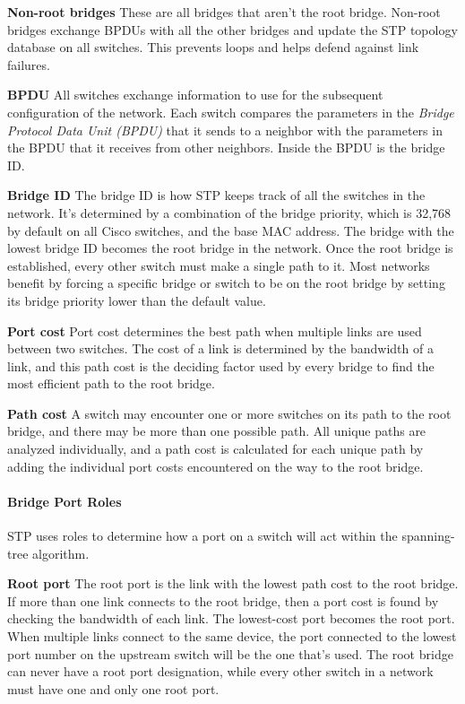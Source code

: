 \textbf{Non-root bridges} These are all bridges that aren't the root
bridge. Non-root bridges exchange BPDUs with all the other bridges and
update the STP topology database on all switches. This prevents loops
and helps defend against link failures.

\textbf{BPDU} All switches exchange information to use for the
subsequent configuration of the network. Each switch compares the
parameters in the \emph{Bridge Protocol Data Unit (BPDU)} that it sends
to a neighbor with the parameters in the BPDU that it receives from
other neighbors. Inside the BPDU is the bridge ID.

\textbf{Bridge ID} The bridge ID is how STP keeps track of all the
switches in the network. It's determined by a combination of the bridge
priority, which is 32,768 by default on all Cisco switches, and the base
MAC address. The bridge with the lowest bridge ID becomes the root
bridge in the network. Once the root bridge is established, every other
switch must make a single path to it. Most networks benefit by forcing a
specific bridge or switch to be on the root bridge by setting its bridge
priority lower than the default value.

\textbf{Port cost} Port cost determines the best path when multiple
links are used between two switches. The cost of a link is determined by
the bandwidth of a link, and this path cost is the deciding factor used
by every bridge to find the most efficient path to the root bridge.

\textbf{Path cost} A switch may encounter one or more switches on its
path to the root bridge, and there may be more than one possible path.
All unique paths are analyzed individually, and a path cost is
calculated for each unique path by adding the individual port costs
encountered on the way to the root bridge.

\paragraph{Bridge Port Roles}

STP uses roles to determine how a port on a switch will act within the
spanning-tree algorithm.

\textbf{Root port} The root port is the link with the lowest path cost
to the root bridge. If more than one link connects to the root bridge,
then a port cost is found by checking the bandwidth of each link. The
lowest-cost port becomes the root port. When multiple links connect to
the same device, the port connected to the lowest port number on the
upstream switch will be the one that's used. The root bridge can never
have a root port designation, while every other switch in a network must
have one and only one root port.

